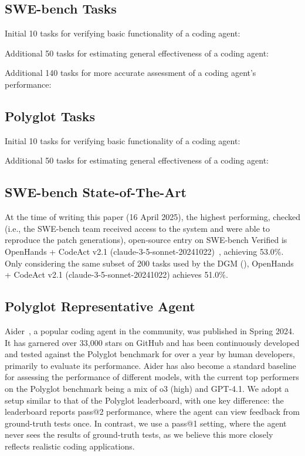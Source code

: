 \documentclass{article}
\begin{document}
\subsection{SWE-bench Tasks}
\label{app:swebench-tasks}

Initial 10 tasks for verifying basic functionality of a coding agent:


Additional 50 tasks for estimating general effectiveness of a coding agent:


Additional 140 tasks for more accurate assessment of a coding agent's performance:


\subsection{Polyglot Tasks}
\label{app:polyglot-tasks}

Initial 10 tasks for verifying basic functionality of a coding agent:


Additional 50 tasks for estimating general effectiveness of a coding agent:


\subsection{SWE-bench State-of-The-Art}
\label{app:swebench-sota}
At the time of writing this paper (16 April 2025), the highest performing, checked (i.e., the SWE-bench team received access to the system and were able to reproduce the patch generations), open-source entry on SWE-bench Verified is OpenHands + CodeAct v2.1 (claude-3-5-sonnet-20241022)~\citep{wang2024openhands}, achieving 53.0\%. Only considering the same subset of 200 tasks used by the DGM (), OpenHands + CodeAct v2.1 (claude-3-5-sonnet-20241022) achieves 51.0\%.

\subsection{Polyglot Representative Agent}
\label{app:polyglot-sota}

Aider~\citep{aider2024}, a popular coding agent in the community, was published in Spring 2024. It has garnered over 33,000 stars on GitHub and has been continuously developed and tested against the Polyglot benchmark for over a year by human developers, primarily to evaluate its performance. Aider has also become a standard baseline for assessing the performance of different models, with the current top performers on the Polyglot benchmark being a mix of o3 (high) and GPT-4.1. We adopt a setup similar to that of the Polyglot leaderboard, with one key difference: the leaderboard reports pass@2 performance, where the agent can view feedback from ground-truth tests once. In contrast, we use a pass@1 setting, where the agent never sees the results of ground-truth tests, as we believe this more closely reflects realistic coding applications.
\end{document}
